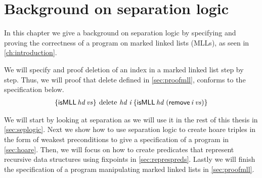 \documentclass[thesis.tex]{subfiles}
\begin{document}
\chapter{Background on separation logic}

In this chapter we give a background on separation logic by specifying and proving the correctness of a program on marked linked lists (MLLs), as seen in \cref*{ch:introduction}.

We will specify and proof deletion of an index in a marked linked list step by step. Thus, we will proof that delete defined in \cref*{sec:proofmll}, conforms to the specification below.
\begin{align*}
  \hoare{\textlog{isMLL}\, \langv{hd}\, \langv{vs}}{\operatorname{delete}\, \langv{hd}\; \langv{i}}{\textlog{isMLL}\, \langv{hd}\; (\textlog{remove}\, \langv{i}\, \langv{vs})}
\end{align*}

We will start by looking at separation as we will use it in the rest of this thesis in \cref*{sec:seplogic}. Next we show how to use separation logic to create hoare triples in the form of weakest preconditions to give a specification of a program in \cref*{sec:hoare}. Then, we will focus on how to create predicates that represent recursive data structures using fixpoints in \cref*{sec:represpreds}. Lastly we will finish the specification of a program manipulating marked linked lists in \cref*{sec:proofmll}.
\end{document}
